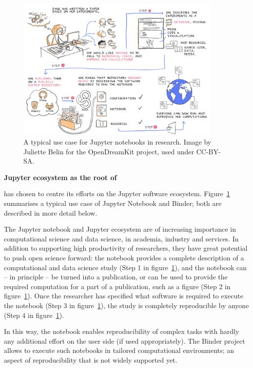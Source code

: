 \begin{figure}[htb]\centering
  \includegraphics[width=0.9\textwidth]{use-cases-binder-logbook-solution.png}
  \caption{A typical use case for Jupyter notebooks in research.
            Image by Juliette Belin for the OpenDreamKit project, used under
            CC-BY-SA.}\label{fig:use-cases-binder}
\end{figure}

\noindent\textbf{Jupyter ecosystem as the root of \TheProject}


\TheProject has chosen to centre its efforts on the Jupyter software
ecosystem. Figure~\ref{fig:use-cases-binder} summarises a typical use
case of Jupyter Notebook and Binder; both are described in more detail
below.

The Jupyter notebook and Jupyter ecosystem are of increasing
importance in computational science and data science, in academia,
industry and services. In addition to supporting high productivity of
researchers, they have great potential to push open science forward:
the notebook provides a complete description of a computational and
data science study (Step 1 in figure~\ref{fig:use-cases-binder}), and the notebook can -- in principle -- be turned
into a publication, or can be used to provide the required computation
for a part of a publication, such as a figure
(Step 2 in figure~\ref{fig:use-cases-binder}). Once the researcher has
specified what software is required to execute the notebook (Step 3
in figure~\ref{fig:use-cases-binder}), the study is completely
reproducible by anyone (Step 4 in figure~\ref{fig:use-cases-binder}).

In this way, the notebook enables reproducibility of complex tasks
with hardly any additional effort on the user side (if used
appropriately). The Binder project allows to execute such notebooks in
tailored computational environments; an aspect of reproducibility that
is not widely supported yet.

